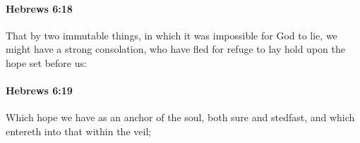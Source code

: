 		\paragraph{Hebrews 6:18} %
			\label{HEBREWS-6-18}

			That by two immutable things, in which it was impossible for God to lie, we might have a strong consolation, who have fled for refuge to lay hold upon the hope set before us:

			\begin{framed}
			\scriptsize
				\begin{compactdesc}
					\item[SBLG] 
				\end{compactdesc}
			\end{framed}

		\paragraph{Hebrews 6:19} %
			\label{HEBREWS-6-19}

			Which hope we have as an anchor of the soul, both sure and stedfast, and which entereth into that within the veil;

